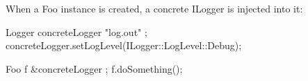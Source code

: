 When a Foo instance is created, a concrete ILogger is injected into it:

\begin{cpp}
Logger concreteLogger { "log.out" };
concreteLogger.setLogLevel(ILogger::LogLevel::Debug);

Foo f { &concreteLogger };
f.doSomething();
\end{cpp}






























